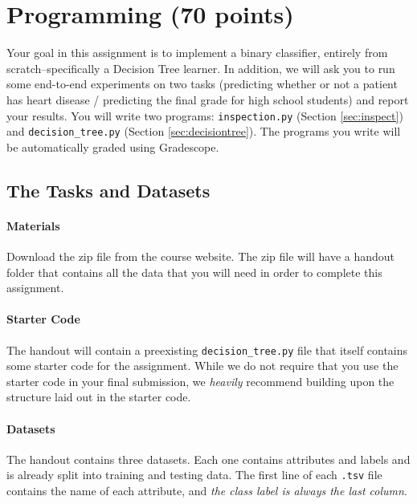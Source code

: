 \documentclass[11pt,addpoints,answers]{exam}
\begin{document}
\section{Programming (70 points)}

Your goal in this assignment is to implement a binary classifier, entirely from scratch--specifically a Decision Tree learner. In addition, we will ask you to run some end-to-end experiments on two tasks (predicting whether or not a patient has heart disease / predicting the final grade for high school students) and report your results.
%
You will write two programs: \texttt{inspection.py} (Section \ref{sec:inspect}) and \texttt{decision\_tree.py} (Section \ref{sec:decisiontree}). The programs you write will be automatically graded using Gradescope.

\subsection{The Tasks and Datasets}
\label{sec:data}

\paragraph{Materials} Download the zip file from the course website. The zip file will have a handout folder that contains all the data that you will need in order to complete this assignment.

\paragraph{Starter Code} The handout will contain a preexisting \texttt{decision\_tree.py} file that itself contains some starter code for the assignment. While we do not require that you use the starter code in your final submission, we \emph{heavily} recommend building upon the structure laid out in the starter code.

\paragraph{Datasets}

The handout contains three datasets. Each one contains attributes and labels and is already split into training and testing data. The first line of each \lstinline{.tsv} file contains the name of each attribute, and \emph{the class label is always the last column}.
\end{document}
